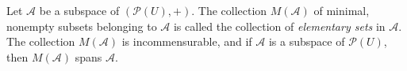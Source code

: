 Let $\mathcal{A}$ be a subspace of $(\mathcal{P}(U), +)$. The collection $M(\mathcal{A})$ of minimal, nonempty subsets belonging to $\mathcal{A}$ is called the collection of \textit{elementary sets} in $\mathcal{A}$. The collection $M(\mathcal{A})$ is incommensurable, and if $\mathcal{A}$ is a subspace of $\mathcal{P}(U)$, then $M(\mathcal{A})$ spans $\mathcal{A}$.
